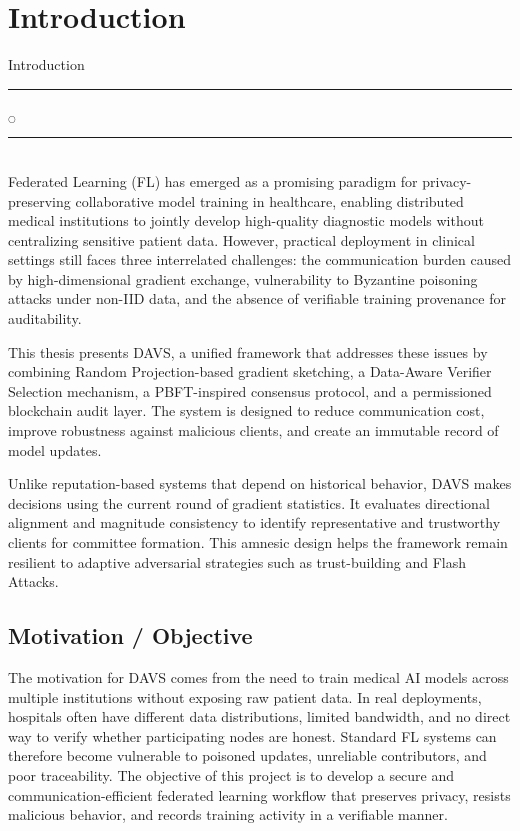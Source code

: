 \chapter[Introduction]{Introduction}{Introduction}\label{Intro}

\noindent
\rule{0.49\textwidth}{0.75pt} $_{\bigcirc}$ \rule{0.49\textwidth}{0.75pt}\\

Federated Learning (FL) has emerged as a promising paradigm for privacy-preserving collaborative model training in healthcare, enabling distributed medical institutions to jointly develop high-quality diagnostic models without centralizing sensitive patient data. However, practical deployment in clinical settings still faces three interrelated challenges: the communication burden caused by high-dimensional gradient exchange, vulnerability to Byzantine poisoning attacks under non-IID data, and the absence of verifiable training provenance for auditability.

This thesis presents DAVS, a unified framework that addresses these issues by combining Random Projection-based gradient sketching, a Data-Aware Verifier Selection mechanism, a PBFT-inspired consensus protocol, and a permissioned blockchain audit layer. The system is designed to reduce communication cost, improve robustness against malicious clients, and create an immutable record of model updates.

Unlike reputation-based systems that depend on historical behavior, DAVS makes decisions using the current round of gradient statistics. It evaluates directional alignment and magnitude consistency to identify representative and trustworthy clients for committee formation. This amnesic design helps the framework remain resilient to adaptive adversarial strategies such as trust-building and Flash Attacks.

\noindent

\section{Motivation / Objective}
The motivation for DAVS comes from the need to train medical AI models across multiple institutions without exposing raw patient data. In real deployments, hospitals often have different data distributions, limited bandwidth, and no direct way to verify whether participating nodes are honest. Standard FL systems can therefore become vulnerable to poisoned updates, unreliable contributors, and poor traceability. The objective of this project is to develop a secure and communication-efficient federated learning workflow that preserves privacy, resists malicious behavior, and records training activity in a verifiable manner.


